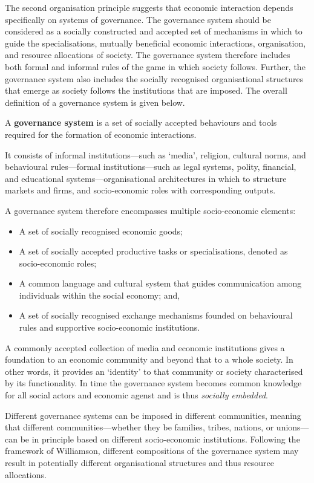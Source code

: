 The second organisation principle suggests that economic interaction depends specifically on systems of governance. The governance system should be considered as a socially constructed and accepted set of mechanisms in which to guide the specialisations, mutually beneficial economic interactions, organisation, and resource allocations of society. The governance system therefore includes both formal and informal rules of the game in which society follows. Further, the governance system also includes the socially recognised organisational structures that emerge as society follows the institutions that are imposed. The overall definition of a governance system is given below.

\begin{definition} \label{def:governancesystem}
A \textbf{governance system} is a set of socially accepted behaviours and tools required for the formation of economic interactions.

It consists of informal institutions---such as `media', religion, cultural norms, and behavioural rules---formal institutions---such as legal systems, polity, financial, and educational systems---organisational architectures in which to structure markets and firms, and socio-economic roles with corresponding outputs.
\end{definition}
A governance system therefore encompasses multiple socio-economic elements: 
\begin{itemize}
\item A set of socially recognised economic goods; 
\item A set of socially accepted productive tasks or specialisations, denoted as socio-economic roles; 
\item A common language and cultural system that guides communication among individuals within the social economy; and, 
\item A set of socially recognised exchange mechanisms founded on behavioural rules and supportive socio-economic institutions. 
\end{itemize}
A commonly accepted collection of media and economic institutions gives a foundation to an economic community and beyond that to a whole society. In other words, it provides an `identity' to that community or society characterised by its functionality. In time the governance system becomes common knowledge for all social actors and economic agenst and is thus \emph{socially embedded}.

Different governance systems can be imposed in different communities, meaning that different communities---whether they be families, tribes, nations, or unions---can be in principle based on different socio-economic institutions. Following the framework of Williamson, different compositions of the governance system may result in potentially different organisational structures and thus resource allocations.

